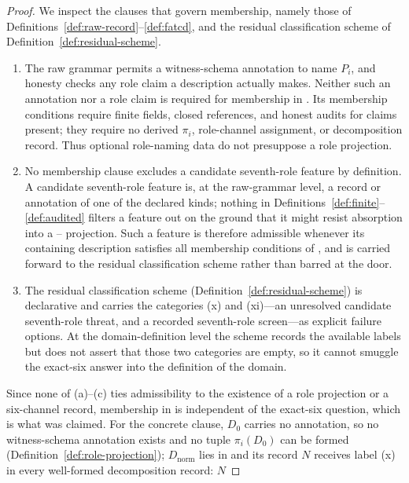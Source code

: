 \begin{proof}
We inspect the clauses that govern membership, namely those of
Definitions~\ref{def:raw-record}--\ref{def:fatcd}, and the residual
classification scheme of Definition~\ref{def:residual-scheme}.
\begin{enumerate}[label=(\alph*),topsep=2pt,itemsep=1pt]
  \item The raw grammar permits a witness-schema annotation to name \(P_i\),
    and honesty checks any role claim a description actually makes. Neither
    such an annotation nor a role claim is required for membership in
    \FATCD{}. Its membership conditions require finite fields, closed
    references, and honest audits for claims present; they require no
    derived \(\pi_i\), role-channel assignment, or decomposition record.
    Thus optional role-naming data do not presuppose a role projection.
  \item No membership clause excludes a candidate seventh-role feature by
    definition. A candidate seventh-role feature is, at the raw-grammar
    level, a record or annotation of one of the declared kinds; nothing in
    Definitions~\ref{def:finite}--\ref{def:audited} filters a feature out on
    the ground that it might resist absorption into a
    \Pone{}--\Psix{} projection. Such a feature is therefore admissible
    whenever its containing description satisfies all membership conditions of \FATCD{}, and is carried forward to
    the residual classification scheme rather than barred at the door.
  \item The residual classification scheme
    (Definition~\ref{def:residual-scheme}) is declarative and carries the
    categories (x) and (xi)---an unresolved candidate seventh-role threat,
    and a recorded seventh-role screen---as explicit failure
    options. At the domain-definition level the scheme records the available
    labels but does not assert that those two categories are empty, so it
    cannot smuggle the exact-six answer into the definition of the domain.
\end{enumerate}
Since none of (a)--(c) ties admissibility to the existence of a role
projection or a six-channel record, membership in \FATCD{} is independent of
the exact-six question, which is what was claimed. For the concrete clause,
\(D_0\) carries no annotation, so no witness-schema annotation exists and no
tuple \(\pi_i(D_0)\) can be formed (Definition~\ref{def:role-projection}); \(D_{\mathrm{norm}}\) lies in \FATCD{}
and its record \(N\) receives label (x) in every well-formed decomposition record: \(N\)

\end{proof}
